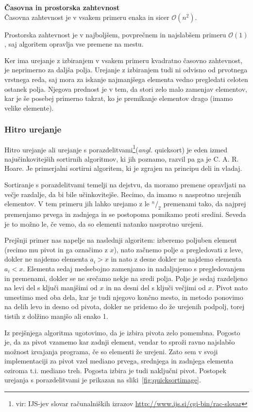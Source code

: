 \documentclass[a4paper,oneside,12pt]{article}
\newcommand{\subsubsubsection}[1]{\vspace*{1ex}\textbf{#1}\\}
\begin{document}
\subsubsubsection{Časovna in prostorska zahtevnost} \nopagebreak
Časovna zahtevnost je v vsakem primeru enaka in sicer $\mathcal{O}(n^2)$.

Prostorska zahtevnost je v najboljšem, povprečnem in najslabšem primeru $\mathcal{O}(1)$, 
saj algoritem opravlja vse premene na mestu.

Ker ima urejanje z izbiranjem v vsakem primeru kvadratno časovno zahtevnost, je neprimerno
za daljša polja. Urejanje z izbiranjem tudi ni odvisno od prvotnega vrstnega reda,
saj mora za iskanje najmanjšega elementa vedno pregledati celoten ostanek polja.
Njegova prednost je v tem, da stori zelo malo zamenjav elementov, kar je še posebej
primerno takrat, ko je premikanje elementov drago (imamo velike elemente).

\subsubsection{Hitro urejanje}
\label{chapter:quicksort}
Hitro urejanje ali urejanje s porazdelitvami\footnote{vir: IJS-jev slovar računalniških izrazov
\url{http://www.ijs.si/cgi-bin/rac-slovar}}(\emph{angl.} quicksort) je eden izmed
najučinkovitejših sortirnih algoritmov, ki jih poznamo, razvil pa ga je C. A. R. Hoare.
Je primerjalni sortirni algoritem, ki je zgrajen na principu deli in vladaj.

Sortiranje s porazdelitvami temelji na dejstvu, da moramo premene opravljati na večje
razdalje, da bi bile učinkovitejše. Recimo, da imamo $n$ nasprotno urejenih elementov.
V tem primeru jih lahko urejamo z le $^n/_2$ premenami tako, da najprej premenjamo prvega
in zadnjega in se postopoma pomikamo proti sredini. Seveda je to možno le, če vemo, da so 
elementi natanko nasprotno urejeni.

Prejšnji primer nas napelje na naslednji algoritem: 
izberemo poljuben element (recimo mu pivot in ga označimo z $x$), nato začnemo 
polje $a$ pregledovati z leve, dokler ne najdemo elementa $a_i > x$ in nato z desne dokler ne 
najdemo elementa $a_i < x$. Elementa sedaj medsebojno zamenjamo in nadaljujemo s 
pregledovanjem in premenami, dokler se ne srečamo nekje na sredi polja.
Polje je sedaj razdeljeno na levi del s ključi manjšimi od $x$ in na desni del
s ključi večjimi od $x$. Pivot nato umestimo med oba dela, kar je tudi njegovo končno
mesto, in metodo ponovimo na delih levo in desno od pivota, dokler ne pridemo do že urejenih
podpolj, torej tistih z dolžino manjšo ali enako 1. 

Iz prejšnjega algoritma ugotovimo, da je izbira pivota zelo
pomembna. Pogosto je, da za pivot vzamemo kar zadnji element, vendar to sproži ravno
najslabšo možnost izvajanja programa, če so elementi že urejeni. Zato sem v svoji
implementaciji za pivot vzel mediano prvega, srednjega in zadnjega elementa oziroma t.i.
mediano treh. Pogosta izbira je tudi naključni pivot. Postopek urejanja s
porazdelitvami je prikazan na sliki~\ref{fig:quicksortimage}.
\end{document}
